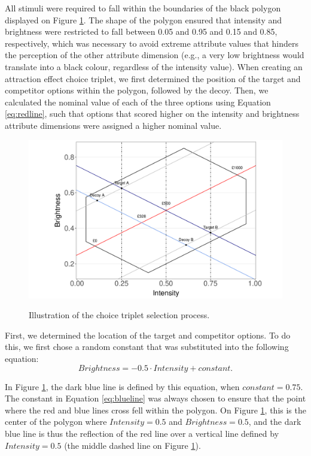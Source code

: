 \documentclass[11pt,a4paper]{article}
\begin{document}
All stimuli were required to fall within the boundaries of the black polygon displayed on Figure \ref{fig:explain}. The shape of the polygon ensured that intensity and brightness were restricted to fall between 0.05 and 0.95 and 0.15 and 0.85, respectively, which was necessary to avoid extreme attribute values that hinders the perception of the other attribute dimension (e.g., a very low brightness would translate into a black colour, regardless of the intensity value). When creating an attraction effect choice triplet, we first determined the position of the target and competitor options within the polygon, followed by the decoy. Then, we calculated the nominal value of each of the three options using Equation \ref{eq:redline}, such that options that scored higher on the intensity and brightness attribute dimensions were assigned a higher nominal value.

\begin{figure}
\centering
\caption{Illustration of the choice triplet selection process.}
\includegraphics[width=1\textwidth]{AE_teapots_Figure_1poly.pdf}
\label{fig:explain}
\end{figure}

 First, we determined the location of the target and competitor options. To do this, we first chose a random constant that was substituted into the following equation:
\begin{equation} \label{eq:blueline}
 Brightness = -0.5 \cdot Intensity + constant.
\end{equation}

In Figure \ref{fig:explain}, the dark blue line is defined by this equation, when $constant = 0.75$. The constant in Equation \ref{eq:blueline} was always chosen to ensure that the point where the red and blue lines cross fell within the polygon. On Figure \ref{fig:explain}, this is the center of the polygon where $Intensity = 0.5$ and $Brightness = 0.5$, and the dark blue line is thus the reflection of the red line over a vertical line defined by $Intensity = 0.5$ (the middle dashed line on Figure \ref{fig:explain}).
\end{document}
